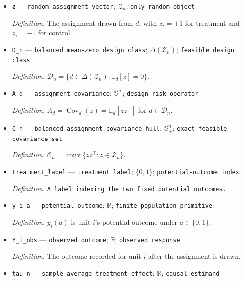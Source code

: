\documentclass{article}
\begin{document}
\begin{itemize}
  \par\smallskip\noindent\emph{Definition.} \texttt{A probability law selected before outcomes are observed.}
  \item \texttt{z} --- \texttt{random assignment vector}; \(\mathcal Z_n\); \texttt{only random object}
  \par\smallskip\noindent\emph{Definition.} The assignment drawn from \(d\), with \(z_i=+1\) for treatment and \(z_i=-1\) for control.
  \item \texttt{D\_\allowbreak{}n} --- \texttt{balanced mean-\allowbreak{}zero design class}; \(\Delta(\mathcal Z_n)\); \texttt{feasible design class}
  \par\smallskip\noindent\emph{Definition.} \(\mathcal D_n=\{d\in\Delta(\mathcal Z_n):\mathbb E_d[z]=0\}\).
  \item \texttt{A\_\allowbreak{}d} --- \texttt{assignment covariance}; \(\mathbb S_+^n\); \texttt{design risk operator}
  \par\smallskip\noindent\emph{Definition.} \(A_d=\operatorname{Cov}_d(z)=\mathbb E_d[zz^\top]\) for \(d\in\mathcal D_n\).
  \item \texttt{C\_\allowbreak{}n} --- \texttt{balanced assignment-\allowbreak{}covariance hull}; \(\mathbb S_+^n\); \texttt{exact feasible covariance set}
  \par\smallskip\noindent\emph{Definition.} \(\mathcal C_n=\operatorname{conv}\{zz^\top:z\in\mathcal Z_n\}\).
  \item \texttt{treatment\_\allowbreak{}label} --- \texttt{treatment label}; \(\{0,1\}\); \texttt{potential-\allowbreak{}outcome index}
  \par\smallskip\noindent\emph{Definition.} \texttt{A label indexing the two fixed potential outcomes.}
  \item \texttt{y\_\allowbreak{}i\_\allowbreak{}a} --- \texttt{potential outcome}; \(\mathbb R\); \texttt{finite-\allowbreak{}population primitive}
  \par\smallskip\noindent\emph{Definition.} \(y_i(a)\) is unit \(i\)'s potential outcome under \(a\in\{0,1\}\).
  \item \texttt{Y\_\allowbreak{}i\_\allowbreak{}obs} --- \texttt{observed outcome}; \(\mathbb R\); \texttt{observed response}
  \par\smallskip\noindent\emph{Definition.} The outcome recorded for unit \(i\) after the assignment is drawn.
  \item \texttt{tau\_\allowbreak{}n} --- \texttt{sample average treatment effect}; \(\mathbb R\); \texttt{causal estimand}

\end{itemize}
\end{document}
